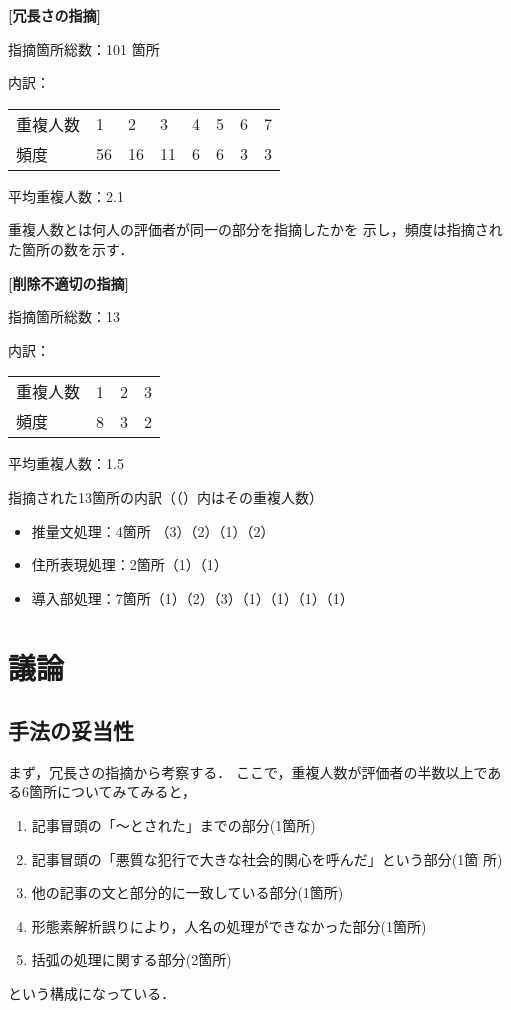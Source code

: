 \noindent
{\bf [冗長さの指摘]}

指摘箇所総数：101 箇所

内訳：

\begin{tabular}{l|lllllll}
重複人数 &  1&  2&  3& 4& 5& 6& 7\\
頻度     & 56& 16& 11& 6& 6& 3& 3\\
\end{tabular}
\vspace*{3mm}

平均重複人数：2.1
\vspace*{3mm}

重複人数とは何人の評価者が同一の部分を指摘したかを
示し，頻度は指摘された箇所の数を示す．

\vspace*{5mm}

\noindent
{\bf [削除不適切の指摘]}

指摘箇所総数：13

内訳：

\begin{tabular}{l|lll}
重複人数 &  1& 2&  3\\
頻度     &  8& 3&  2\\
\end{tabular}
\vspace*{3mm}

平均重複人数：1.5
\vspace*{3mm}

指摘された13箇所の内訳（（）内はその重複人数）
\begin{itemize}
 \item 推量文処理：4箇所 （3）（2）（1）（2）
 \item 住所表現処理：2箇所（1）（1）
 \item 導入部処理：7箇所（1）（2）（3）（1）（1）（1）（1）
\end{itemize}

\section{議論} \label{議論}

\subsection{手法の妥当性}

まず，冗長さの指摘から考察する．
ここで，重複人数が評価者の半数以上である6箇所についてみてみると，
\begin{enumerate}
 \item 記事冒頭の「〜とされた」までの部分(1箇所)
 \item 記事冒頭の「悪質な犯行で大きな社会的関心を呼んだ」という部分(1箇
       所)
 \item 他の記事の文と部分的に一致している部分(1箇所)
 \item 形態素解析誤りにより，人名の処理ができなかった部分(1箇所)
 \item 括弧の処理に関する部分(2箇所)
\end{enumerate}
という構成になっている．

